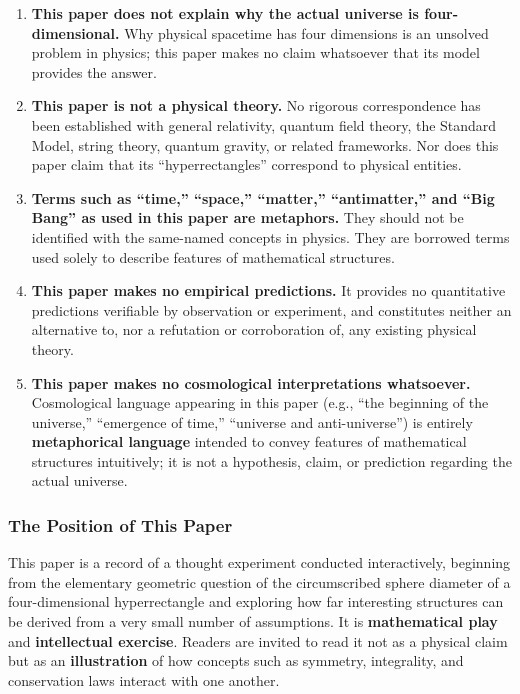 \documentclass[a4paper,11pt]{article}
\theoremstyle{definition}
\providecommand{\tightlist}{\setlength{\itemsep}{0pt}\setlength{\parskip}{0pt}}
\begin{document}
\begin{enumerate}
\def\labelenumi{\arabic{enumi}.}
\tightlist
\item
  \textbf{This paper does not explain why the actual universe is
  four-dimensional.} Why physical spacetime has four dimensions is an
  unsolved problem in physics; this paper makes no claim whatsoever that
  its model provides the answer.
\item
  \textbf{This paper is not a physical theory.} No rigorous
  correspondence has been established with general relativity, quantum
  field theory, the Standard Model, string theory, quantum gravity, or
  related frameworks. Nor does this paper claim that its
  ``hyperrectangles'' correspond to physical entities.
\item
  \textbf{Terms such as ``time,'' ``space,'' ``matter,'' ``antimatter,''
  and ``Big Bang'' as used in this paper are metaphors.} They should not
  be identified with the same-named concepts in physics. They are
  borrowed terms used solely to describe features of mathematical
  structures.
\item
  \textbf{This paper makes no empirical predictions.} It provides no
  quantitative predictions verifiable by observation or experiment, and
  constitutes neither an alternative to, nor a refutation or
  corroboration of, any existing physical theory.
\item
  \textbf{This paper makes no cosmological interpretations whatsoever.}
  Cosmological language appearing in this paper (e.g., ``the beginning
  of the universe,'' ``emergence of time,'' ``universe and
  anti-universe'') is entirely \textbf{metaphorical language} intended
  to convey features of mathematical structures intuitively; it is not a
  hypothesis, claim, or prediction regarding the actual universe.
\end{enumerate}

\subsubsection{The Position of This
Paper}\label{the-position-of-this-paper}

This paper is a record of a thought experiment conducted interactively,
beginning from the elementary geometric question of the circumscribed
sphere diameter of a four-dimensional hyperrectangle and exploring how
far interesting structures can be derived from a very small number of
assumptions. It is \textbf{mathematical play} and \textbf{intellectual
exercise}. Readers are invited to read it not as a physical claim but as
an \textbf{illustration} of how concepts such as symmetry, integrality,
and conservation laws interact with one another.
\end{document}
